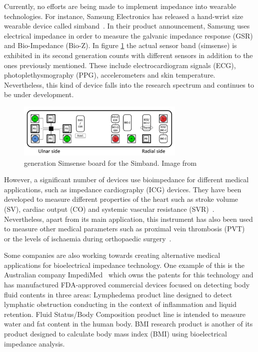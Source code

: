 Currently, no efforts are being made to implement impedance into wearable technologies. For instance, Samsung Electronics has released a hand-wrist size wearable device called simband~\cite{simsense}. In their product announcement, Samsung uses electrical impedance in order to measure the galvanic impedance response (GSR) and Bio-Impedance (Bio-Z). In figure \ref{fig:simsense} the actual sensor band (simsense) is exhibited in its second generation counts with different sensors in addition to the ones previously mentioned. These include electrocardiogram signals (ECG), photoplethysmography (PPG), accelerometers and skin temperature. Nevertheless, this kind of device falls into the research spectrum and continues to be under development.

\begin{figure}[!htpb]
	\centering
	\includegraphics[width=8cm,keepaspectratio]{figure10}    
	\caption[ generation Simsense board for the Simband]{ generation Simsense board for the Simband. Image from \cite{simsense}}
	\label{fig:simsense}
\end{figure}

However, a significant number of devices use bioimpedance for different medical applications, such as impedance cardiography (ICG) devices. They have been developed to measure different properties of the heart such as stroke volume (SV), cardiac output (CO) and systemic vascular resistance (SVR)~\cite{neath2005utility}.  Nevertheless, apart from its main application, this instrument has also been used to measure other medical parameters such as proximal vein thrombosis (PVT)~\cite{hull1978impedance} or the levels of ischaemia during orthopaedic surgery~\cite{distefano1973bioelectrical}.

Some companies are also working towards creating alternative medical applications for bioelectrical impedance technology. One example of this is the Australian company ImpediMed~\cite{impedimed} which owns the patents for this technology and has manufactured FDA-approved commercial devices focused on detecting body fluid contents in three areas: Lymphedema product line designed to detect lymphatic obstruction conducting in the context of inflammation and liquid retention.  Fluid Status/Body Composition product line is intended to measure water and fat content in the human body. BMI research product is another of its product designed to calculate body mass index (BMI) using bioelectrical impedance analysis.

